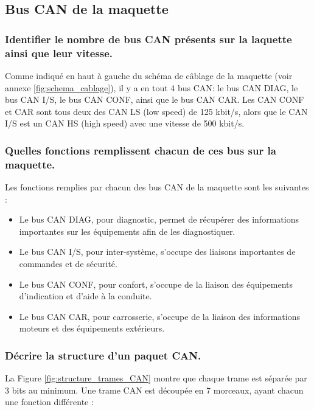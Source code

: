 \documentclass{rapportECC}
\begin{document}
\subsection{Bus CAN de la maquette}

\subsubsection*{Identifier le nombre de bus CAN présents sur la laquette ainsi que leur vitesse.}

Comme indiqué en haut à gauche du schéma de câblage de la maquette (voir annexe \ref{fig:schema_cablage}), il y a en tout 4 bus CAN: le bus CAN DIAG, le bus CAN I/S, le bus CAN CONF, ainsi que le bus CAN CAR. Les CAN CONF et CAR sont tous deux des CAN LS (low speed) de 125 kbit/s, alors que le CAN I/S est un CAN HS (high speed) avec une vitesse de 500 kbit/s.

\subsubsection*{Quelles fonctions remplissent chacun de ces bus sur la maquette.}

Les fonctions remplies par chacun des bus CAN de la maquette sont les suivantes :

\begin{itemize}
    \item Le bus CAN DIAG, pour diagnostic, permet de récupérer des informations importantes sur les équipements afin de les diagnostiquer.
    \item Le bus CAN I/S, pour inter-système, s'occupe des liaisons importantes de commandes et de sécurité.
    \item Le bus CAN CONF, pour confort, s'occupe de la liaison des équipements d'indication et d'aide à la conduite.
    \item Le bus CAN CAR, pour carrosserie, s'occupe de la liaison des informations moteurs et des équipements extérieurs.
\end{itemize}

\subsubsection*{Décrire la structure d'un paquet CAN.}

La Figure \ref{fig:structure_trames_CAN} montre que chaque trame est séparée par 3 bits au minimum. Une trame CAN est découpée en 7 morceaux, ayant chacun une fonction différente :
\end{document}
